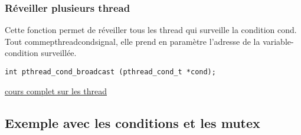 \documentclass[a4paper]{article}
\begin{document}
\subsubsection{Réveiller plusieurs thread}
Cette fonction permet de réveiller tous les thread qui surveille la condition cond. Tout comme\newline pthread\textunderscore{}cond\textunderscore{}signal, elle prend en paramètre l'adresse de la variable-condition surveillée. 
\begin{lstlisting}
int pthread_cond_broadcast (pthread_cond_t *cond);
\end{lstlisting}
\href{http://franckh.developpez.com/tutoriels/posix/pthreads/}{cours complet sur les thread}
\newpage
\subsection{Exemple avec les conditions et les mutex}
\end{document}
